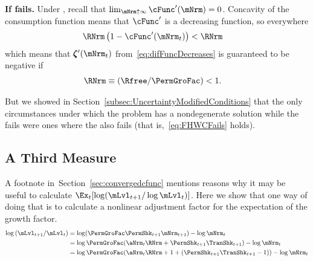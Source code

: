 \documentclass[\econtexRoot/BufferStockTheory]{subfiles}
\begin{document}
\textbf{If {\RIC} fails.}
Under \cncl{\RIC}, recall that $\lim_{\mNrm \uparrow \infty} \cFunc^{\prime}(\mNrm) = 0$.  Concavity of the consumption function means that $\cFunc^{\prime}$ is a decreasing function, so everywhere 
\begin{align*}
  \RNrm\left(1-\cFunc^{\prime}({\mNrm}_t)\right) & < \RNrm
\end{align*}
which means that $\difFunc^{\prime}(\mNrm_{t})$ from~\eqref{eq:difFuncDecreases} is guaranteed to be negative if
\begin{equation}\begin{gathered}\begin{aligned}
  \RNrm \equiv (\Rfree/\PermGroFac) & < 1  \label{eq:FHWCFails}.
\end{aligned}\end{gathered}\end{equation}

But we showed in Section~\ref{subsec:UncertaintyModifiedConditions} that the only circumstances under which the problem has a nondegenerate solution while the {\RIC} fails were ones where the {\FHWC} also fails (that is,~\eqref{eq:FHWCFails} holds).

\subsection{A Third Measure}

A footnote in~Section~\ref{sec:convergedcfunc} mentions reasons why it may be useful to calculate $\Ex_{t}[\log (\mLvl_{t+1}/\log \mLvl_{t})]$.  Here we show that one way of doing that is to calculate a nonlinear adjustment factor for the expectation of the growth factor.
\begin{align*}
\log \left(\mLvl_{t+1}/\mLvl_{t}\right) & = \log (\PermGroFac \PermShk_{t+1} \mNrm_{t+1})- \log \mNrm_{t} 
\\ & = \log \PermGroFac (\aNrm_{t}\RNrm+\PermShk_{t+1}\TranShk_{t+1})- \log \mNrm_{t} 
\\ & = \log \PermGroFac (\aNrm_{t}\RNrm+1+(\PermShk_{t+1}\TranShk_{t+1}-1))- \log \mNrm_{t}
\end{align*}
\end{document}
